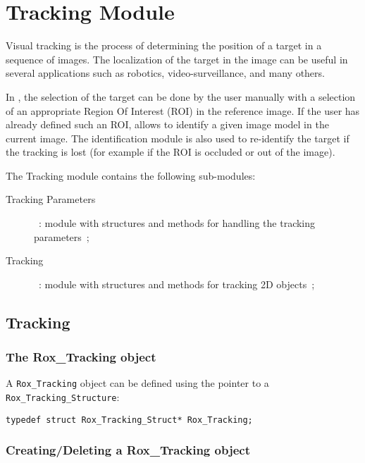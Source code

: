 \chapter{Tracking Module}
\label{cha:track}

Visual tracking is the process of determining the position of a target
in a sequence of images. The localization of the target in the image
can be useful in several applications such as robotics,
video-surveillance, and many others.

In \rox{}, the selection of the target can be done by the user manually
with a selection of an appropriate Region Of Interest (ROI) in the
reference image. If the user has already defined such an ROI, \rox{} allows to identify a given image model in the current image. The
identification module is also used to re-identify the target if the tracking is
lost (for example if the ROI is occluded or out of the image).

The Tracking module contains the following sub-modules:

\begin{description}
  \item[Tracking Parameters]~: module with structures and methods for handling the tracking parameters~;

  \item[Tracking]~: module with structures and methods for tracking 2D objects~;

\end{description}



\section{Tracking}
\label{sec:tracking}


\subsection{The Rox\_Tracking object}
\label{sse:tracking_object}

A \lstinline$Rox_Tracking$ object can be defined using the pointer to a \lstinline$Rox_Tracking_Structure$:
\begin{lstlisting}
typedef struct Rox_Tracking_Struct* Rox_Tracking;
\end{lstlisting}

\subsection{Creating/Deleting a Rox\_Tracking object}
\label{sss:track2d_initializing}

